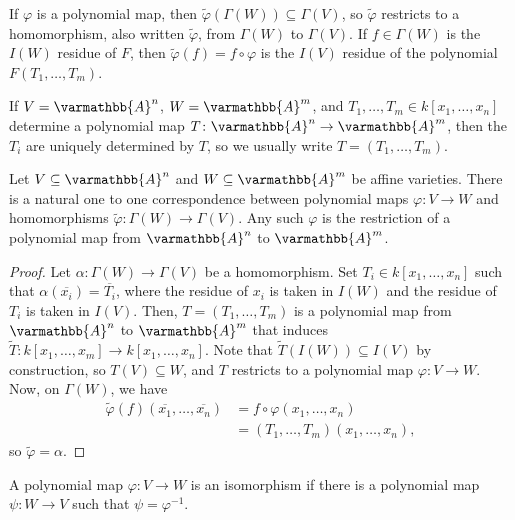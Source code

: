 \documentclass[10pt]{mypackage}
\renewcommand*{\mathbb}[1]{\varmathbb{#1}}
\newcommand{\A}{\mathbb{A}}
\begin{document}
If $\varphi$ is a polynomial map, then $\widetilde{\varphi}\left( \Gamma\left( W \right) \right)\subseteq \Gamma\left( V \right)$, so $\widetilde{\varphi}$ restricts to a homomorphism, also written $\widetilde{\varphi}$, from $\Gamma(W)$ to $\Gamma(V)$. If $f\in \Gamma(W)$ is the $I(W)$ residue of $F$, then $\widetilde{\varphi}\left( f \right) = f\circ\varphi$ is the $I(V)$ residue of the polynomial $F\left( T_1,\dots,T_m \right)$.\newline

If $V = \A^n$, $W = \A^m$, and $T_1,\dots,T_m\in k\left[ x_1,\dots,x_n \right]$ determine a polynomial map $T\colon \A^n\rightarrow \A^m$, then the $T_i$ are uniquely determined by $T$, so we usually write $T = \left( T_1,\dots,T_m \right)$.
\begin{proposition}
  Let $V\subseteq \A^n$ and $W\subseteq \A^m$ be affine varieties. There is a natural one to one correspondence between polynomial maps $\varphi\colon V\rightarrow W$ and homomorphisms $\widetilde{\varphi}\colon \Gamma(W)\rightarrow \Gamma(V)$. Any such $\varphi$ is the restriction of a polynomial map from $\A^n$ to $\A^m$.
\end{proposition}
\begin{proof}
  Let $\alpha\colon \Gamma\left( W \right)\rightarrow \Gamma\left( V \right)$ be a homomorphism. Set $T_i\in k\left[ x_1,\dots,x_n \right]$ such that $\alpha\left( \overline{x_i} \right) = \overline{T_i}$, where the residue of $x_i$ is taken in $I(W)$ and the residue of $T_i$ is taken in $I(V)$. Then, $T = \left( T_1,\dots,T_m \right)$ is a polynomial map from $\A^n$ to $\A^m$ that induces $\widetilde{T}\colon k\left[ x_1,\dots,x_m \right]\rightarrow k\left[ x_1,\dots,x_n \right]$. Note that $\widetilde{T}\left( I(W) \right)\subseteq I(V)$ by construction, so $T(V)\subseteq W$, and $T$ restricts to a polynomial map $\varphi\colon V\rightarrow W$. Now, on $\Gamma(W)$, we have
  \begin{align*}
    \widetilde{\varphi}\left( f \right)\left(\overline{x_1},\dots,\overline{x_n}\right) &= f\circ \varphi\left( x_1,\dots,x_n \right)\\
                                                                                        &= \left( T_1,\dots,T_m \right)\left( x_1,\dots,x_n \right),
  \end{align*}
  so $\widetilde{\varphi} = \alpha$.
\end{proof}
\begin{definition}
  A polynomial map $\varphi\colon V\rightarrow W$ is an isomorphism if there is a polynomial map $\psi\colon W\rightarrow V$ such that $\psi = \varphi^{-1}$.
\end{definition}
\end{document}
